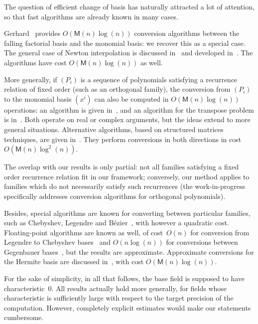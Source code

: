 \documentclass{sig-alternate}
\def\M{\ensuremath{\mathsf{M}}}
\begin{document}
\smallskip{} The question of efficient
change of basis has naturally attracted a lot of attention, so that
fast algorithms are already known in many cases.

Gerhard~\cite{Gerhard00} provides $O(\M(n) \log(n))$ conversion
algori\-thms between the falling factorial basis and the monomial basis:
we recover this as a special case.  The general case of Newton
interpolation is discussed in~\cite[p. 67]{BiPa94} and
developed in~\cite{BoSc05}. The algorithms have cost $O(\M(n)
\log(n))$ as well.

More generally, if $(P_i)$ is a sequence of polynomials satisfying a
recurrence relation of fixed order (such as an orthogonal family), the
conversion from $(P_i)$ to the monomial basis $(x^i)$ can also be
computed in $O(\M(n) \log(n))$ operations: an algorithm is given
in~\cite{PoStTa98}, and an algorithm for the transpose problem is
in~\cite{DrHeRo97}. Both operate on real or complex arguments, but the
ideas extend to more general situations.  Alternative algorithms,
based on structured matrices techniques, are given
in~\cite{Heinig01}. They perform conversions in both directions in
cost $O(\M(n) \log^2(n))$.

The overlap with our results is only partial: not all families
satisfying a fixed order recurrence relation fit in our framework;
conversely, our method applies to families which do not necessarily
satisfy such recurrences (the work-in-progress~\cite{BoSaSc08}
specifically addresses conversion algorithms for orthogonal polynomials).

Besides, special algorithms are known for converting between
particular families, such as Chebyshev, Legendre and
B\'ezier~\cite{LiZh98,BaPe04}, with however a quadratic
cost. Floating-point algorithms are known as well, of cost~$O(n)$ for
conversion from Legendre to Chebyshev bases~\cite{AlRo91} and $O(n
\log(n))$ for conversions between Gegenbauer bases~\cite{Keiner07},
but the results are approximate. Approximate conversions for the
Hermite basis are discussed in~\cite{LeRoCh07}, with cost $O(\M(n)
\log(n))$.

\smallskip{} For the sake of
simplicity, in all that follows, the base field is supposed to have
characteristic~0. All results actually hold more generally, for fields
whose characteristic is sufficiently large with respect to the target
precision of the computation. However, completely explicit estimates
would make our statements cumbersome.
\end{document}
